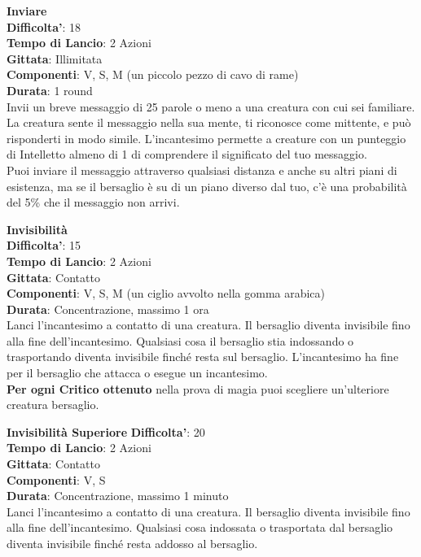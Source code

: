 \begin{multicols}{2}
\medskip\textbf{Inviare}\\
\textbf{Difficolta'}: 18\\
\textbf{Tempo di Lancio}: 2 Azioni\\
\textbf{Gittata}: Illimitata\\
\textbf{Componenti}: V, S, M (un piccolo pezzo di cavo di rame)\\
\textbf{Durata}: 1 round\\
Invii un breve messaggio di 25 parole o meno a una creatura con cui sei familiare. La creatura sente il messaggio nella sua mente, ti riconosce come mittente, e può risponderti in modo simile. L’incantesimo permette a creature con un punteggio di Intelletto almeno di 1 di comprendere il significato del tuo messaggio.\\
Puoi inviare il messaggio attraverso qualsiasi distanza e anche su altri piani di esistenza, ma se il bersaglio è su di un piano diverso dal tuo, c’è una probabilità del 5\% che il messaggio non arrivi.

\medskip\textbf{Invisibilità}\\
\textbf{Difficolta'}: 15\\
\textbf{Tempo di Lancio}: 2 Azioni\\
\textbf{Gittata}: Contatto\\
\textbf{Componenti}: V, S, M (un ciglio avvolto nella gomma arabica)\\
\textbf{Durata}: Concentrazione, massimo 1 ora \\
Lanci l’incantesimo a contatto di una creatura. Il bersaglio diventa invisibile fino alla fine dell’incantesimo. Qualsiasi cosa il bersaglio stia indossando o trasportando diventa invisibile finché resta sul bersaglio. L’incantesimo ha fine per il bersaglio che attacca o esegue un incantesimo.\\
\textbf{Per ogni Critico ottenuto} nella prova di magia puoi scegliere un’ulteriore creatura bersaglio.

\medskip\textbf{Invisibilità Superiore}
\textbf{Difficolta'}: 20\\
\textbf{Tempo di Lancio}: 2 Azioni\\
\textbf{Gittata}: Contatto\\
\textbf{Componenti}: V, S\\
\textbf{Durata}: Concentrazione, massimo 1 minuto\\
Lanci l’incantesimo a contatto di una creatura. Il bersaglio diventa invisibile fino alla fine dell’incantesimo. Qualsiasi cosa indossata o trasportata dal bersaglio diventa invisibile finché resta addosso al bersaglio.


\end{multicols}
